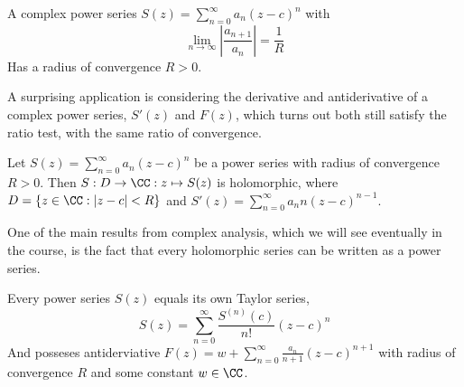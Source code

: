 \begin{proposition}
  A complex power series $S(z)=\sum_{n=0}^{\infty} a_n(z-c)^n$ with 
  \[\lim_{n\to\infty} \left|\frac{a_{n+1}}{a_n}\right| = \frac{1}{R}\]
  Has a radius of convergence $R>0$.
  \label{prop:ratioTest}
\end{proposition}

A surprising application is considering the derivative and antiderivative of a
complex power series, $S'(z)$ and $F(z)$, which turns out both still satisfy the
ratio test, with the same ratio of convergence.

\begin{proposition}
  Let $S(z)=\sum_{n=0}^{\infty} a_n(z-c)^n$ be a power series with radius of
  convergence $R>0$. Then $S:D\to\CC:z\mapsto S(z)$ is holomorphic, where
  $D=\{z\in\CC : |z-c|<R\}$ and $S'(z) = \sum_{n=0}^{\infty} a_n
  n(z-c)^{n-1}$.
  \label{prop:powerSeriesIsHolom}
\end{proposition}
\begin{remark}
  One of the main results from complex analysis, which we will see eventually in
  the course, is the fact that every holomorphic series can be written as a
  power series.
\end{remark}
\begin{corollary}
  Every power series $S(z)$ equals its own Taylor series,
  \[S(z) = \sum_{n=0}^{\infty} \frac{S^{(n)}(c)}{n!} (z-c)^n\]
  And posseses antiderviative $F(z)=w+\sum_{n=0}^{\infty}
  \frac{a_n}{n+1}(z-c)^{n+1}$ with radius of convergence $R$ and some constant
  $w\in\CC$.
\end{corollary}
